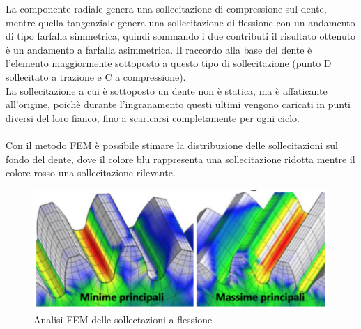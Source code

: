 La componente radiale genera una sollecitazione di compressione sul dente, mentre quella tangenziale genera una sollecitazione di flessione con un andamento di tipo farfalla simmetrica, quindi sommando i due contributi il risultato ottenuto è un andamento a farfalla asimmetrica. Il raccordo alla base del dente è l'elemento maggiormente sottoposto a questo tipo di sollecitazione (punto D 
sollecitato a trazione e C a compressione).\\
La sollecitazione a cui è sottoposto un dente non è statica, ma è affaticante all’origine, poichè durante l'ingranamento questi ultimi vengono caricati in punti diversi del loro fianco, fino a scaricarsi completamente per ogni ciclo.\\
\\
Con il metodo FEM è possibile stimare la distribuzione delle sollecitazioni sul fondo del dente, dove il colore blu rappresenta una sollecitazione ridotta mentre il colore rosso una sollecitazione rilevante. 
\begin{figure}[h]
    \centering
    \includegraphics[scale=0.4]{Immagini/FEM.png}
    \caption{Analisi FEM delle sollectazioni a flessione}
    \label{fig:FEM}
\end{figure}
